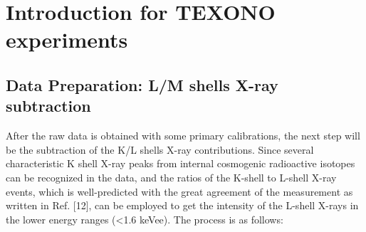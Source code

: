 \chapter{Introduction for TEXONO experiments}

\section{Data Preparation: L/M shells X-ray subtraction}
After the raw data is obtained with some primary calibrations, the next step will be the subtraction of the K/L shells X-ray contributions. Since several characteristic K shell X-ray peaks from internal cosmogenic radioactive isotopes can be recognized in the data, and the ratios of the K-shell to L-shell X-ray events, which is well-predicted with the great agreement of the measurement as written in Ref. [12], can be employed to get the intensity of the L-shell X-rays in the lower energy ranges (<1.6 keVee). The process is as follows:
